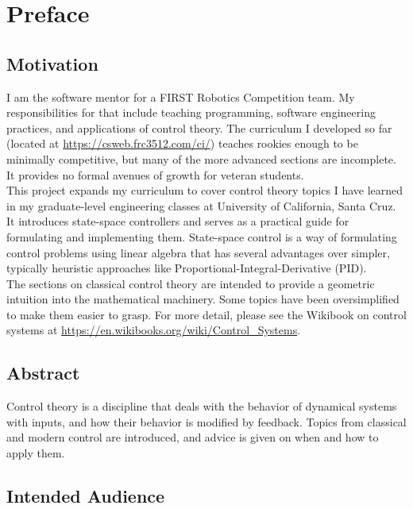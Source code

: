 \documentclass[10pt,conference,compsoc]{IEEEtran}
\begin{document}
\section{Preface}

\subsection{Motivation}

I am the software mentor for a FIRST Robotics Competition team. My
responsibilities for that include teaching programming, software engineering
practices, and applications of control theory. The curriculum I developed so far
(located at \url{https://csweb.frc3512.com/ci/}) teaches rookies enough to be
minimally competitive, but many of the more advanced sections are incomplete. It
provides no formal avenues of growth for veteran students. \\

This project expands my curriculum to cover control theory topics I have learned
in my graduate-level engineering classes at University of California,
Santa Cruz. It introduces state-space controllers and serves as a practical
guide for formulating and implementing them. State-space control is a way of
formulating control problems using linear algebra that has several advantages
over simpler, typically heuristic approaches like
Proportional-Integral-Derivative (PID). \\

The sections on classical control theory are intended to provide a geometric
intuition into the mathematical machinery. Some topics have been oversimplified
to make them easier to grasp. For more detail, please see the Wikibook on
control systems at \url{https://en.wikibooks.org/wiki/Control_Systems}.

\subsection{Abstract}

Control theory is a discipline that deals with the behavior of dynamical
\glspl{system} with inputs, and how their behavior is modified by feedback.
Topics from classical and modern control are introduced, and advice is given on
when and how to apply them.

\subsection{Intended Audience}
\end{document}
